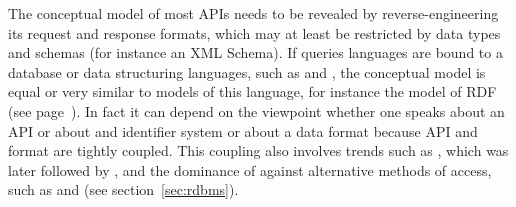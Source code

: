 
The conceptual model of most APIs needs to be revealed by reverse-engineering
its request and response formats, which may at least be restricted by data
types and schemas (for instance an XML Schema). If queries languages are bound
to a database or data structuring languages, such as  and
, the conceptual model is equal or very similar to models of this
language, for instance the model of RDF (see page~\pageref{sec:rdfmodels}). In fact
it can depend on the viewpoint whether one speaks about an API or about and
identifier system or about a data format because API and format are tightly
coupled. This coupling also involves trends such as , which was later
followed by , and the dominance of  against alternative
methods of access, such as  and
 (see section~\ref{sec:rdbms}).







